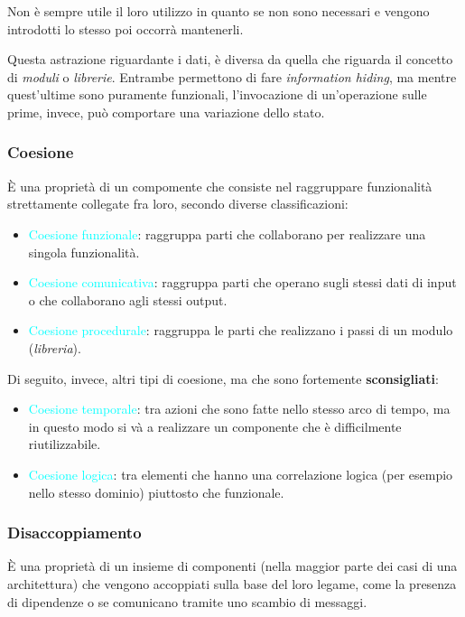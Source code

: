 Non è sempre utile il loro utilizzo in quanto se non sono necessari e vengono introdotti lo stesso
poi occorrà mantenerli.

Questa astrazione riguardante i dati, è diversa da quella che riguarda il concetto di \emph{moduli} o \emph{librerie}.
Entrambe permettono di fare \emph{information hiding}, ma mentre quest'ultime sono puramente funzionali, l'invocazione di un'operazione
sulle prime, invece, può comportare una variazione dello stato.

\subsubsection{Coesione}

È una proprietà di un compomente che consiste nel raggruppare funzionalità strettamente
collegate fra loro, secondo diverse classificazioni:

\begin{itemize}
    \item \textcolor{cyan}{Coesione funzionale}: raggruppa parti che collaborano per realizzare
        una singola funzionalità.
    \item \textcolor{cyan}{Coesione comunicativa}: raggruppa parti che operano sugli stessi dati di input
        o che collaborano agli stessi output.
    \item \textcolor{cyan}{Coesione procedurale}: raggruppa le parti che realizzano i passi di un modulo (\emph{libreria}).
\end{itemize}

Di seguito, invece, altri tipi di coesione, ma che sono fortemente \textbf{sconsigliati}:
\begin{itemize}
    \item \textcolor{cyan}{Coesione temporale}: tra azioni che sono fatte nello stesso arco di tempo, ma in questo modo si và a realizzare
        un componente che è difficilmente riutilizzabile.
    \item \textcolor{cyan}{Coesione logica}: tra elementi che hanno una correlazione logica (per esempio nello stesso dominio) piuttosto che funzionale.
\end{itemize}

\subsubsection{Disaccoppiamento}

È una proprietà di un insieme di componenti (nella maggior parte dei casi di una architettura) che vengono accoppiati
sulla base del loro legame, come la presenza di dipendenze o se comunicano tramite uno scambio di messaggi.

